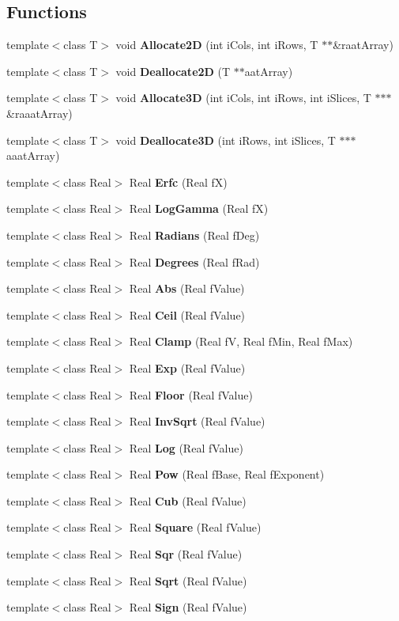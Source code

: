 \subsection*{Functions}
\begin{CompactItemize}
\item 
template$<$class T$>$ void {\bf Allocate2D} (int i\-Cols, int i\-Rows, T $\ast$$\ast$\&raat\-Array)
\item 
template$<$class T$>$ void {\bf Deallocate2D} (T $\ast$$\ast$aat\-Array)
\item 
template$<$class T$>$ void {\bf Allocate3D} (int i\-Cols, int i\-Rows, int i\-Slices, T $\ast$$\ast$$\ast$\&raaat\-Array)
\item 
template$<$class T$>$ void {\bf Deallocate3D} (int i\-Rows, int i\-Slices, T $\ast$$\ast$$\ast$aaat\-Array)
\item 
template$<$class Real$>$ Real {\bf Erfc} (Real f\-X)
\item 
template$<$class Real$>$ Real {\bf Log\-Gamma} (Real f\-X)
\item 
template$<$class Real$>$ Real {\bf Radians} (Real f\-Deg)
\item 
template$<$class Real$>$ Real {\bf Degrees} (Real f\-Rad)
\item 
template$<$class Real$>$ Real {\bf Abs} (Real f\-Value)
\item 
template$<$class Real$>$ Real {\bf Ceil} (Real f\-Value)
\item 
template$<$class Real$>$ Real {\bf Clamp} (Real f\-V, Real f\-Min, Real f\-Max)
\item 
template$<$class Real$>$ Real {\bf Exp} (Real f\-Value)
\item 
template$<$class Real$>$ Real {\bf Floor} (Real f\-Value)
\item 
template$<$class Real$>$ Real {\bf Inv\-Sqrt} (Real f\-Value)
\item 
template$<$class Real$>$ Real {\bf Log} (Real f\-Value)
\item 
template$<$class Real$>$ Real {\bf Pow} (Real f\-Base, Real f\-Exponent)
\item 
template$<$class Real$>$ Real {\bf Cub} (Real f\-Value)
\item 
template$<$class Real$>$ Real {\bf Square} (Real f\-Value)
\item 
template$<$class Real$>$ Real {\bf Sqr} (Real f\-Value)
\item 
template$<$class Real$>$ Real {\bf Sqrt} (Real f\-Value)
\item 
template$<$class Real$>$ Real {\bf Sign} (Real f\-Value)

\end{CompactItemize}
